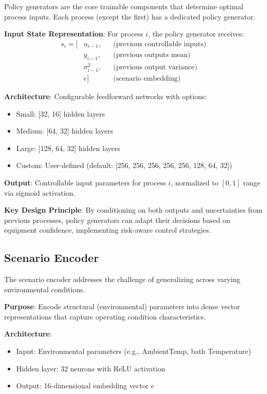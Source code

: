 \documentclass[11pt,a4paper]{article}
\begin{document}
Policy generators are the core trainable components that determine optimal process inputs. Each process (except the first) has a dedicated policy generator.

\textbf{Input State Representation}: For process $i$, the policy generator receives:
\begin{align*}
s_i = [&u_{i-1}, && \text{(previous controllable inputs)} \\
       &y_{i-1}, && \text{(previous outputs mean)} \\
       &\sigma^2_{i-1}, && \text{(previous output variance)} \\
       &e] && \text{(scenario embedding)}
\end{align*}

\textbf{Architecture}: Configurable feedforward networks with options:
\begin{itemize}
    \item Small: [32, 16] hidden layers
    \item Medium: [64, 32] hidden layers
    \item Large: [128, 64, 32] hidden layers
    \item Custom: User-defined (default: [256, 256, 256, 256, 256, 128, 64, 32])
\end{itemize}

\textbf{Output}: Controllable input parameters for process $i$, normalized to $[0,1]$ range via sigmoid activation.

\textbf{Key Design Principle}: By conditioning on both outputs and uncertainties from previous processes, policy generators can adapt their decisions based on equipment confidence, implementing risk-aware control strategies.

\subsection{Scenario Encoder}

The scenario encoder addresses the challenge of generalizing across varying environmental conditions.

\textbf{Purpose}: Encode structural (environmental) parameters into dense vector representations that capture operating condition characteristics.

\textbf{Architecture}:
\begin{itemize}
    \item Input: Environmental parameters (e.g., AmbientTemp, bath Temperature)
    \item Hidden layer: 32 neurons with ReLU activation
    \item Output: 16-dimensional embedding vector $e$
\end{itemize}
\end{document}
